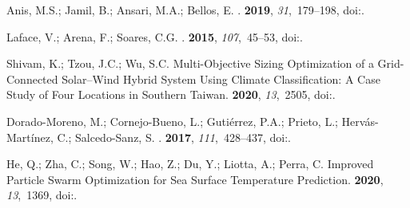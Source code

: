 \documentclass[energies,article,accept,moreauthors,pdftex]{Definitions/mdpi}
\begin{document}
%
%
\begin{thebibliography}{999}

Anis, M.S.; Jamil, B.; Ansari, M.A.; Bellos, E.
.
 {\bf 2019},
  {\em 31},~179--198, 
\newblock
  doi:{\href{https://doi.org/10.1016/j.seta.2018.12.009}{}}.

Laface, V.; Arena, F.; Soares, C.G.
.
 {\bf 2015}, {\em 107},~45--53, 
\newblock
  doi:{\href{https://doi.org/10.1016/j.oceaneng.2015.07.027}{}}.

Shivam, K.; Tzou, J.C.; Wu, S.C.
\newblock Multi-Objective Sizing Optimization of a Grid-Connected Solar–Wind
  Hybrid System Using Climate Classification: A Case Study of Four Locations in
  Southern Taiwan.
 {\bf 2020}, {\em 13},~2505, 
\newblock
  doi:{\href{https://doi.org/10.3390/en13102505}{}}.

Dorado-Moreno, M.; Cornejo-Bueno, L.; Guti{\'e}rrez, P.A.; Prieto, L.;
  Herv{\'a}s-Mart{\'i}nez, C.; Salcedo-Sanz, S.
.
 {\bf 2017}, {\em 111},~428--437, 
\newblock
  doi:{\href{https://doi.org/10.1016/j.renene.2017.04.016}{}}.

He, Q.; Zha, C.; Song, W.; Hao, Z.; Du, Y.; Liotta, A.; Perra, C.
\newblock Improved Particle Swarm Optimization for Sea Surface Temperature
  Prediction.
 {\bf 2020}, {\em 13},~1369, 
\newblock
  doi:{\href{https://doi.org/10.3390/en13061369}{}}.


\end{thebibliography}
\end{document}
